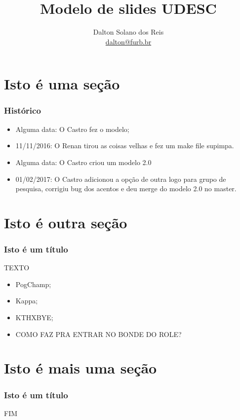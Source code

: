 \documentclass{beamer}
\title[Modelo Slides Udesc]{Modelo de slides UDESC}
\author[Dalton Solano dos Reis]{
  Dalton Solano dos Reis\texorpdfstring{\\\medskip}{}%
  {\small \href{mailto:dalton@furb.br}{dalton@furb.br}}}
\institute[UDESC]{
  Centro de Ciências e Tecnológicas\\
  Universidade do Estado de Santa Catarina}
\begin{document}
\begin{frame}
  \titlepage

\end{frame}

\section{Isto é uma seção}
\begin{frame}
  \frametitle{Histórico}

  \begin{itemize}
  \item Alguma data: O Castro fez o modelo;
  \item 11/11/2016: O Renan tirou as coisas velhas e fez um make file supimpa.
  \item Alguma data: O Castro criou um modelo 2.0
  \item 01/02/2017: O Castro adicionou a opção de outra logo para grupo de pesquisa, corrigiu bug dos acentos e deu merge do modelo 2.0 no master.
  \end{itemize}
\end{frame}

\section{Isto é outra seção}
\begin{frame}
  \frametitle{Isto é um título}

  TEXTO
  \begin{itemize}
  \item PogChamp;
  \item Kappa;
  \item KTHXBYE;
  \item COMO FAZ PRA ENTRAR NO BONDE DO ROLE?
  \end{itemize}
\end{frame}

\section{Isto é mais uma seção}
\begin{frame}
  \frametitle{Isto é um título}

  FIM
\end{frame}
\end{document}
